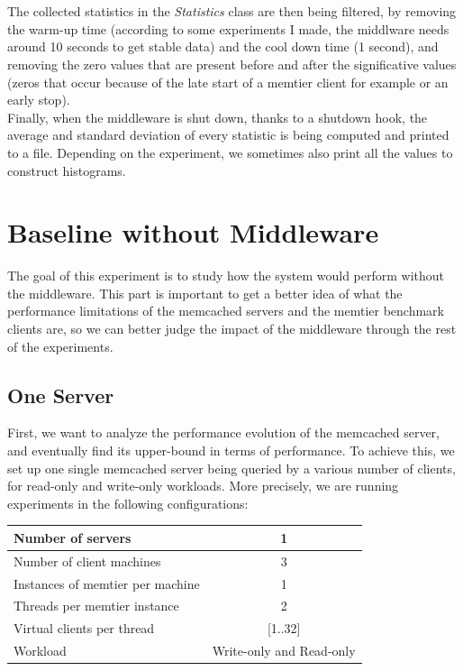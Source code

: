 \documentclass[11pt,a4paper]{article}
\begin{document}
\\\\
The collected statistics in the \textit{Statistics} class are then being filtered, by removing the warm-up time (according to some experiments I made, the middlware needs around 10 seconds to get stable data) and the cool down time (1 second), and removing the zero values that are present before and after the significative values (zeros that occur because of the late start of a memtier client for example or an early stop). 
\\
Finally, when the middleware is shut down, thanks to a shutdown hook, the average and standard deviation of every statistic is being computed and printed to a file. Depending on the experiment, we sometimes also print all the values to construct histograms.
\newpage  
\section{Baseline without Middleware}
The goal of this experiment is to study how the system would perform without the middleware. This part is important to get a better idea of what the performance limitations of the memcached servers and the memtier benchmark clients are, so we can better judge the impact of the middleware through the rest of the experiments. 

\subsection{One Server}

First, we want to analyze the performance evolution of the memcached server, and eventually find its upper-bound in terms of performance. To achieve this, we set up one single memcached server being queried by a various number of clients, for read-only and write-only workloads. More precisely, we are running experiments in the following configurations:
\begin{center}
	\scriptsize{
		\begin{tabular}{|l|c|}
			\hline Number of servers                & 1                        \\ 
			\hline Number of client machines        & 3                        \\ 
			\hline Instances of memtier per machine & 1                        \\ 
			\hline Threads per memtier instance     & 2                        \\
			\hline Virtual clients per thread       & [1..32]                  \\ 
			\hline Workload                         & Write-only and Read-only \\
			\hline 
		\end{tabular}
	} 
\end{center}
\end{document}
